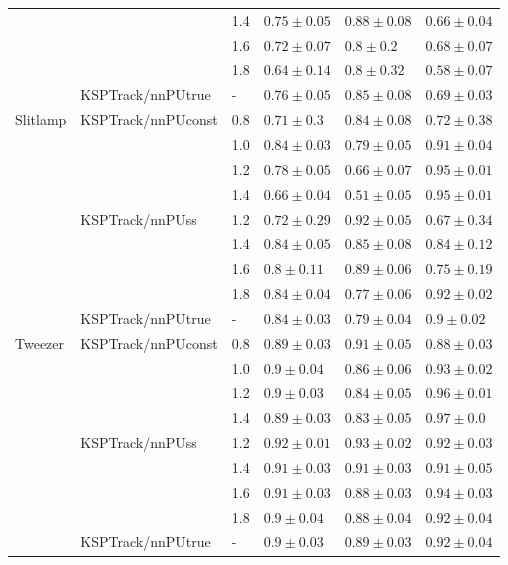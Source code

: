 \begin{table*}
\begin{tabular}{llp{1.8cm}p{1.8cm}p{1.8cm}p{1.8cm}}
        &                   & 1.4 &  $0.75 \pm 0.05$ &  $0.88 \pm 0.08$ &  $0.66 \pm 0.04$ \\
        &                   & 1.6 &  $0.72 \pm 0.07$ &    $0.8 \pm 0.2$ &  $0.68 \pm 0.07$ \\
        &                   & 1.8 &  $0.64 \pm 0.14$ &   $0.8 \pm 0.32$ &  $0.58 \pm 0.07$ \\
\cline{2-6}
        & KSPTrack/nnPUtrue & - &  $0.76 \pm 0.05$ &  $0.85 \pm 0.08$ &  $0.69 \pm 0.03$ \\
\cline{1-6}
\multirow{9}{*}{Slitlamp} & \multirow{4}{*}{KSPTrack/nnPUconst} & 0.8 &   $0.71 \pm 0.3$ &  $0.84 \pm 0.08$ &  $0.72 \pm 0.38$ \\
        &                   & 1.0 &  $0.84 \pm 0.03$ &  $0.79 \pm 0.05$ &  $0.91 \pm 0.04$ \\
        &                   & 1.2 &  $0.78 \pm 0.05$ &  $0.66 \pm 0.07$ &  $0.95 \pm 0.01$ \\
        &                   & 1.4 &  $0.66 \pm 0.04$ &  $0.51 \pm 0.05$ &  $0.95 \pm 0.01$ \\
\cline{2-6}
        & \multirow{4}{*}{KSPTrack/nnPUss} & 1.2 &  $0.72 \pm 0.29$ &  $0.92 \pm 0.05$ &  $0.67 \pm 0.34$ \\
        &                   & 1.4 &  $0.84 \pm 0.05$ &  $0.85 \pm 0.08$ &  $0.84 \pm 0.12$ \\
        &                   & 1.6 &   $0.8 \pm 0.11$ &  $0.89 \pm 0.06$ &  $0.75 \pm 0.19$ \\
        &                   & 1.8 &  $0.84 \pm 0.04$ &  $0.77 \pm 0.06$ &  $0.92 \pm 0.02$ \\
\cline{2-6}
        & KSPTrack/nnPUtrue & - &  $0.84 \pm 0.03$ &  $0.79 \pm 0.04$ &   $0.9 \pm 0.02$ \\
\cline{1-6}
\multirow{9}{*}{Tweezer} & \multirow{4}{*}{KSPTrack/nnPUconst} & 0.8 &  $0.89 \pm 0.03$ &  $0.91 \pm 0.05$ &  $0.88 \pm 0.03$ \\
        &                   & 1.0 &   $0.9 \pm 0.04$ &  $0.86 \pm 0.06$ &  $0.93 \pm 0.02$ \\
        &                   & 1.2 &   $0.9 \pm 0.03$ &  $0.84 \pm 0.05$ &  $0.96 \pm 0.01$ \\
        &                   & 1.4 &  $0.89 \pm 0.03$ &  $0.83 \pm 0.05$ &   $0.97 \pm 0.0$ \\
\cline{2-6}
        & \multirow{4}{*}{KSPTrack/nnPUss} & 1.2 &  $0.92 \pm 0.01$ &  $0.93 \pm 0.02$ &  $0.92 \pm 0.03$ \\
        &                   & 1.4 &  $0.91 \pm 0.03$ &  $0.91 \pm 0.03$ &  $0.91 \pm 0.05$ \\
        &                   & 1.6 &  $0.91 \pm 0.03$ &  $0.88 \pm 0.03$ &  $0.94 \pm 0.03$ \\
        &                   & 1.8 &   $0.9 \pm 0.04$ &  $0.88 \pm 0.04$ &  $0.92 \pm 0.04$ \\
\cline{2-6}
        & KSPTrack/nnPUtrue & - &   $0.9 \pm 0.03$ &  $0.89 \pm 0.03$ &  $0.92 \pm 0.04$ \\
\bottomrule
\end{tabular}
\end{table*}
